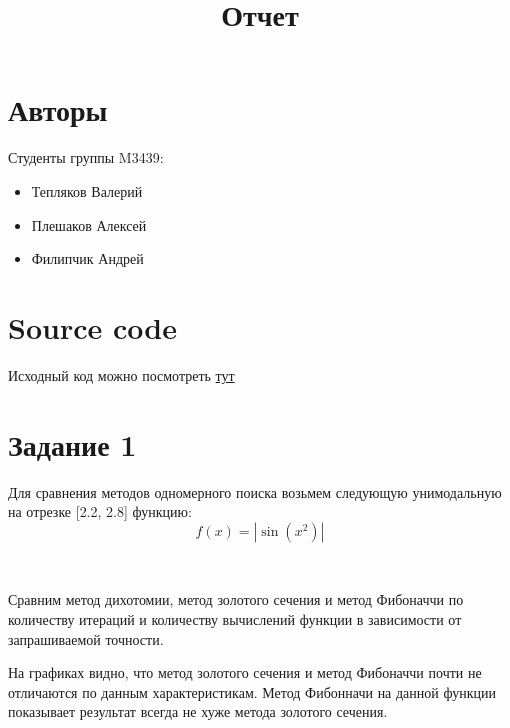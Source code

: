 \documentclass{article}
\date{}
\title{Отчет}
\providecommand{\tightlist}{%
      \setlength{\itemsep}{0pt}\setlength{\parskip}{0pt}}
\begin{document}
    
    \maketitle
    
    

    
    \hypertarget{ux430ux432ux442ux43eux440ux44b}{%
\section{Авторы}\label{ux430ux432ux442ux43eux440ux44b}}

Студенты группы M3439:

\begin{itemize}
\tightlist
\item
  Тепляков Валерий
\item
  Плешаков Алексей
\item
  Филипчик Андрей
\end{itemize}

    \hypertarget{source-code}{%
\section{Source code}\label{source-code}}

Исходный код можно посмотреть
\href{https://github.com/Mervap/OptimizationMethods/tree/master/lab1}{тут}

    \hypertarget{ux437ux430ux434ux430ux43dux438ux435-1}{%
\section{Задание 1}\label{ux437ux430ux434ux430ux43dux438ux435-1}}

    Для сравнения методов одномерного поиска возьмем следующую унимодальную
на отрезке {[}2.2, 2.8{]} функцию: \[f(x) = |\sin(x^2)|\]

    \begin{center}
    \end{center}
    { \hspace*{\fill} \\}
    
    Сравним метод дихотомии, метод золотого сечения и метод Фибоначчи по
количеству итераций и количеству вычислений функции в зависимости от
запрашиваемой точности.

На графиках видно, что метод золотого сечения и метод Фибоначчи почти не
отличаются по данным характеристикам. Метод Фибонначи на данной функции
показывает результат всегда не хуже метода золотого сечения.
\end{document}
